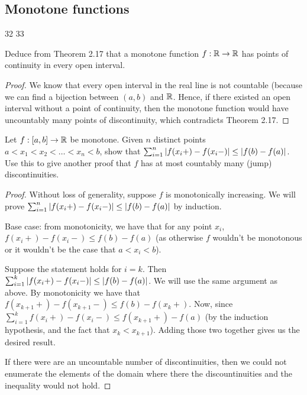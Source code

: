 \subsection{Monotone functions}

32
33

\begin{exercise}{32}
Deduce from Theorem 2.17 that a monotone function $f:\mathbb{R}\to\mathbb{R}$ has points of continuity in every open interval.
\end{exercise}
\begin{proof}
We know that every open interval in the real line is not countable (because we can find a bijection between $(a,b)$ and $\mathbb{R}$. Hence, if there existed an open interval without a point of continuity, then the monotone function would have uncountably many points of discontinuity, which contradicts Theorem 2.17.
\end{proof} 

\begin{exercise}{33}
Let $f:[a,b]\to\mathbb{R}$ be monotone. Given $n$ distinct points $a<x_1<x_2<\dots<x_n<b$, show that $\sum_{i=1}^n\left\lvert f(x_i+)-f(x_i-)\right\rvert\leq \left\lvert f(b)-f(a)\right\rvert$. Use this to give another proof that $f$ has at most countably many (jump) discontinuities.
\end{exercise}
\begin{proof}
Without loss of generality, suppose $f$ is monotonically increasing. We will prove $\sum_{i=1}^n\left\lvert f(x_i+)-f(x_i-)\right\rvert\leq \left\lvert f(b)-f(a)\right\rvert$ by induction.

Base case: from monotonicity, we have that for any point $x_i$, $f(x_i+)-f(x_i-)\leq f(b)-f(a)$ (as otherwise $f$ wouldn't be monotonous or it wouldn't be the case that $a<x_i<b$).

Suppose the statement holds for $i=k$. Then $\sum_{i=1}^k\left\lvert f(x_i+)-f(x_i-)\right\rvert\leq \left\lvert f(b)-f(a)\right\rvert$. We will use the same argument as above. By monotonicity we have that $f(x_{k+1}+)-f(x_{k+1}-)\leq f(b)-f(x_k+)$. Now, since $\sum_{i=1}^k f(x_i+)-f(x_i-)\leq f(x_{k+1}+)-f(a)$ (by the induction hypothesis, and the fact that $x_k<x_{k+1}$). Adding those two together gives us the desired result.

If there were are an uncountable number of discontinuities, then we could not enumerate the elements of the domain where there the discountinuities and the inequality would not hold.
\end{proof} 
